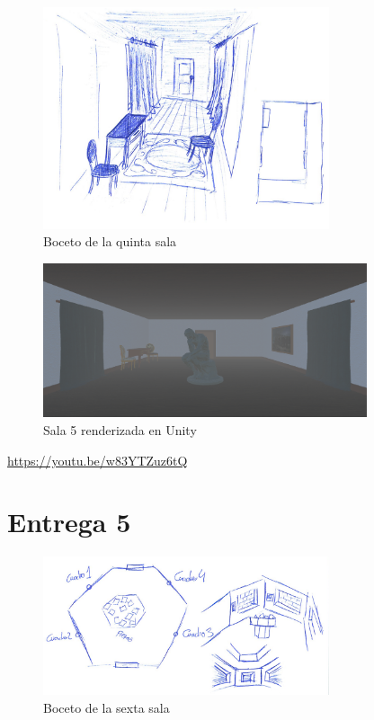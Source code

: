 \begin{figure}[!h]
\begin{center}
\includegraphics[width=0.75\textwidth]{imagenes/7/bocetos/boceto-sala-5.png}
\caption{Boceto de la quinta sala}
\label{fig:bocetos-salas-5}
\end{center}
\end{figure}

\begin{figure}[!h]
\begin{center}
\includegraphics[width=0.85\textwidth]{imagenes/7/salas-unity/unity-sala-5.png}
\caption{Sala 5 renderizada en Unity}
\label{fig:unity-sala-5}
\end{center}
\end{figure}

\begin{center}
    \url{https://youtu.be/w83YTZuz6tQ}
\end{center}


\section{Entrega 5}

\begin{figure}[!h]
\begin{center}
\includegraphics[width=0.75\textwidth]{imagenes/7/bocetos/boceto-sala-6.png}
\caption{Boceto de la sexta sala}
\label{fig:bocetos-salas-6}
\end{center}
\end{figure}

